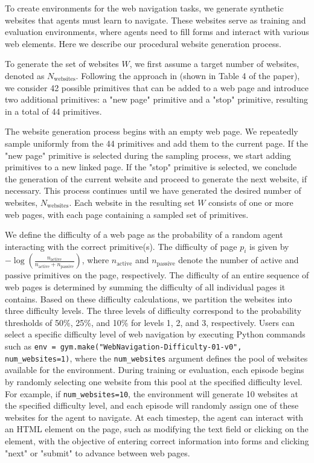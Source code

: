 To create environments for the web navigation tasks, we generate synthetic websites that agents must learn to navigate. These websites serve as training and evaluation environments, where agents need to fill forms and interact with various web elements. Here we describe our procedural website generation process.

To generate the set of websites $W$, we first assume a target number of websites, denoted as $N_{\text{websites}}$.
Following the approach in \citet{gur2021environment} (shown in Table 4 of the paper), we consider 42 possible primitives that can be added to a web page and introduce two additional primitives: a "new page" primitive and a "stop" primitive, resulting in a total of 44 primitives.

The website generation process begins with an empty web page.
We repeatedly sample uniformly from the 44 primitives and add them to the current page.
If the "new page" primitive is selected during the sampling process, we start adding primitives to a new linked page.
If the "stop" primitive is selected, we conclude the generation of the current website and proceed to generate the next website, if necessary.
This process continues until we have generated the desired number of websites, $N_{\text{websites}}$.
Each website in the resulting set $W$ consists of one or more web pages, with each page containing a sampled set of primitives.

We define the difficulty of a web page as the probability of a random agent interacting with the correct primitive(s).
The difficulty of page $p_i$ is given by $-\log \left (\frac{n_{\text{active}}}{n_\text{active}+n_\text{passive}} \right )$, where $n_{\text{active}}$ and $n_{\text{passive}}$ denote the number of active and passive primitives on the page, respectively.
The difficulty of an entire sequence of web pages is determined by summing the difficulty of all individual pages it contains.
Based on these difficulty calculations, we partition the websites into three difficulty levels.
The three levels of difficulty correspond to the probability thresholds of 50\%, 25\%, and 10\% for levels 1, 2, and 3, respectively.
Users can select a specific difficulty level of web navigation by executing Python commands such as \verb|env = gym.make("WebNavigation-Difficulty-01-v0", num_websites=1)|, where the \verb|num_websites| argument defines the pool of websites available for the environment. During training or evaluation, each episode begins by randomly selecting one website from this pool at the specified difficulty level. For example, if \verb|num_websites=10|, the environment will generate 10 websites at the specified difficulty level, and each episode will randomly assign one of these websites for the agent to navigate.
At each timestep, the agent can interact with an HTML element on the page, such as modifying the text field or clicking on the element, with the objective of entering correct information into forms and clicking "next" or "submit" to advance between web pages.

